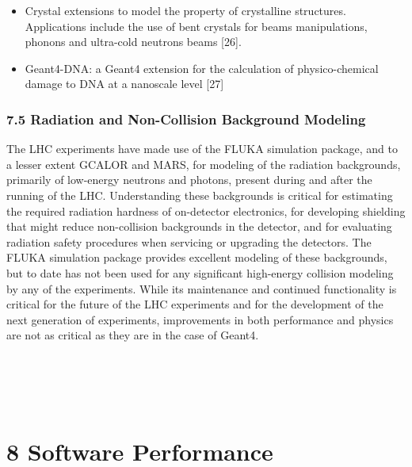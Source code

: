 \documentclass[12pt,a4paper]{article}
\begin{document}
\begin{itemize}
\item
  Crystal extensions to model the property of crystalline structures.
  Applications include the use of bent crystals for beams manipulations,
  phonons and ultra-cold neutrons beams {[}26{]}.
\item
  Geant4-DNA: a Geant4 extension for the calculation of physico-chemical
  damage to DNA at a nanoscale level {[}27{]}
\end{itemize}

\hypertarget{radiation-and-non-collision-background-modeling}{%
\subsubsection{7.5 Radiation and Non-Collision Background
Modeling}\label{radiation-and-non-collision-background-modeling}}

The LHC experiments have made use of the FLUKA simulation package, and
to a lesser extent GCALOR and MARS, for modeling of the radiation
backgrounds, primarily of low-energy neutrons and photons, present
during and after the running of the LHC. Understanding these backgrounds
is critical for estimating the required radiation hardness of
on-detector electronics, for developing shielding that might reduce
non-collision backgrounds in the detector, and for evaluating radiation
safety procedures when servicing or upgrading the detectors. The FLUKA
simulation package provides excellent modeling of these backgrounds, but
to date has not been used for any significant high-energy collision
modeling by any of the experiments. While its maintenance and continued
functionality is critical for the future of the LHC experiments and for
the development of the next generation of experiments, improvements in
both performance and physics are not as critical as they are in the case
of Geant4.

\hypertarget{section-2}{%
\section{}\label{section-2}}

\hypertarget{section-3}{%
\section{\texorpdfstring{\\
}{ }}\label{section-3}}

\hypertarget{software-performance}{%
\section{8 Software Performance}\label{software-performance}}
\end{document}
